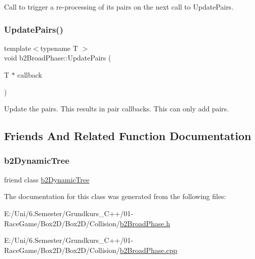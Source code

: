 Call to trigger a re-\/processing of it\textquotesingle{}s pairs on the next call to Update\+Pairs. 

\mbox{\label{classb2_broad_phase_a0a1acd693466b997700242ae00784c20}} 
\subsubsection{\texorpdfstring{UpdatePairs()}{UpdatePairs()}}
{\footnotesize\ttfamily template$<$typename T $>$ \\
void b2\+Broad\+Phase\+::\+Update\+Pairs (\begin{DoxyParamCaption}\item[{T $\ast$}]{callback }\end{DoxyParamCaption})}



Update the pairs. This results in pair callbacks. This can only add pairs. 



\subsection{Friends And Related Function Documentation}
\mbox{\label{classb2_broad_phase_afc450dc71ee33ab0c9e7f1c31d6f7f60}} 
\subsubsection{\texorpdfstring{b2DynamicTree}{b2DynamicTree}}
{\footnotesize\ttfamily friend class \mbox{\hyperlink{classb2_dynamic_tree}{b2\+Dynamic\+Tree}}\hspace{0.3cm}{\ttfamily [friend]}}



The documentation for this class was generated from the following files\+:\begin{DoxyCompactItemize}
\item 
E\+:/\+Uni/6.\+Semester/\+Grundkurs\+\_\+\+C++/01-\/\+Race\+Game/\+Box2\+D/\+Box2\+D/\+Collision/\mbox{\hyperlink{b2_broad_phase_8h}{b2\+Broad\+Phase.\+h}}\item 
E\+:/\+Uni/6.\+Semester/\+Grundkurs\+\_\+\+C++/01-\/\+Race\+Game/\+Box2\+D/\+Box2\+D/\+Collision/\mbox{\hyperlink{b2_broad_phase_8cpp}{b2\+Broad\+Phase.\+cpp}}\end{DoxyCompactItemize}
